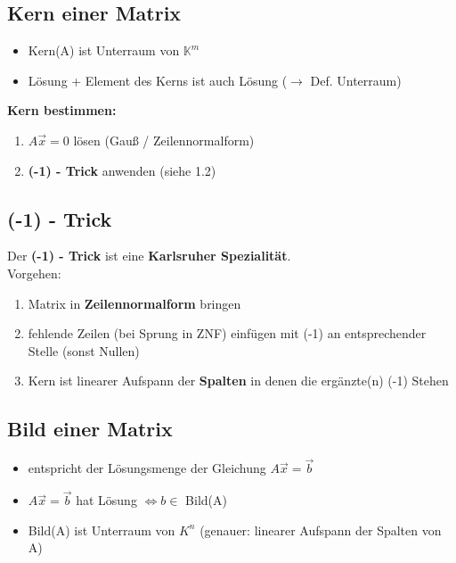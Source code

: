 \documentclass[a4paper,12pt]{article} %
\begin{document}
\subsection{Kern einer Matrix}
\begin{center}
\end{center}
\begin{itemize}
\item Kern(A) ist Unterraum von $\mathbb{K}^m$
\item Lösung + Element des Kerns ist auch Lösung ($\rightarrow$ Def. Unterraum)
\end{itemize}
\textbf{Kern bestimmen:}
\begin{enumerate}
\item $A\vec{x}=0$ lösen (Gauß / Zeilennormalform)
\item \textbf{(-1) - Trick} anwenden (siehe 1.2)
\end{enumerate}
\subsection{(-1) - Trick}
Der \textbf{(-1) - Trick} ist eine \textbf{Karlsruher Spezialität}.\\
Vorgehen:
\begin{enumerate}
\item Matrix in \textbf{Zeilennormalform} bringen
\item fehlende Zeilen (bei Sprung in ZNF) einfügen mit (-1) an entsprechender Stelle (sonst Nullen)
\item Kern ist linearer Aufspann der \textbf{Spalten} in denen die ergänzte(n) (-1) Stehen
\end{enumerate}
\subsection{Bild einer Matrix}
\begin{center}
\end{center}
\begin{itemize}
\item entspricht der Lösungsmenge der Gleichung $A\vec{x} = \vec{b}$
\item $A\vec{x} = \vec{b}$ hat Lösung $\Leftrightarrow b \in$ Bild(A)
\item Bild(A) ist Unterraum von $K^n$ (genauer: linearer Aufspann der Spalten von A)
\end{itemize}
\end{document}

